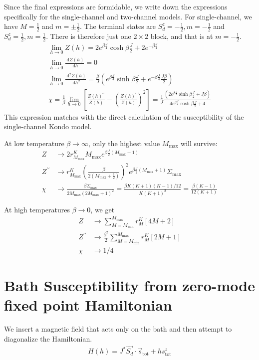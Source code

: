 \documentclass[12pt]{revtex4-2}
\begin{document}
Since the final expressions are formidable, we write down the expressions specifically for the single-channel and two-channel models. For single-channel, we have \(M=\frac{1}{2}\) and \(m = \pm \frac{1}{2}\). The terminal states are \(S_d^z=-\frac{1}{2}, m=-\frac{1}{2}\) and \(S_d^z=\frac{1}{2}, m=\frac{1}{2}\). There is therefore just one \(2\times 2\) block, and that is at \(m=-\frac{1}{2}\).
\begin{gather}
	\lim_{h \to 0}Z(h) = 2e^{\beta \frac{J}{4}}\cosh \beta \frac{J}{2} + 2e^{-\beta \frac{J}{4}} \\
	\lim_{h \to 0}\frac{\:\mathrm{d}Z(h)}{\:\mathrm{d}h} = 0 \\
	\lim_{h \to 0}\frac{\:\mathrm{d}^2Z(h)}{\:\mathrm{d}h^2} = \frac{\beta}{J}\left(e^{\beta \frac{J}{4}}\sinh \beta\frac{J}{2} + e^{-\beta \frac{J}{4}}\frac{J \beta}{2}\right)\\
	\chi = \frac{1}{\beta}\lim_{h \to 0}\left[\frac{Z(h)^{\prime\prime}}{Z(h)} - \left(\frac{Z(h)^{\prime}}{Z(h)}\right)^2 \right] = \frac{1}{J}\frac{\left(2e^{\beta \frac{J}{2}}\sinh \beta\frac{J}{2} + J \beta\right)}{4e^{\beta \frac{J}{2}}\cosh \beta \frac{J}{2} + 4}
\end{gather}
This expression matches with the direct calculation of the susceptibility of the single-channel Kondo model.

At low temperature \(\beta \to \infty\), only the highest value \(M_\text{max}\) will survive:
\begin{align}
	Z &\to 2 r^K_{M_\text{max}} M_\text{max} e^{\beta \frac{J}{2}(M_\text{max} + 1)}\\
	Z^{\prime \prime} &\to r^K_{M_\text{max}}\left(\frac{\beta }{2(M_\text{max} + \frac{1}{2})}\right)^2 e^{\beta \frac{J}{2}(M_\text{max} + 1)}\Sigma_\text{max}\\
	\chi &\to \frac{\beta\Sigma_\text{max}}{2M_\text{max}\left(2M_\text{max}+1\right)^2} = \frac{\beta K(K+1)(K-1)/12}{K(K+1)^2} = \frac{\beta(K-1)}{12(K+1)}
\end{align}

At high temperatures \(\beta \to 0\), we get
\begin{align}
	Z &\to \sum_{M=M_\text{min}}^{M_\text{max}}r^K_M\left[4M + 2\right]\\
	Z^{\prime \prime} &\to \frac{\beta^2}{2}\sum_{M=M_\text{min}}^{M_\text{max}}r^K_M\left[2M + 1\right]\\
	\chi &\to 1/4
\end{align}

\section{Bath Susceptibility from zero-mode fixed point Hamiltonian}
We insert a magnetic field that acts only on the bath and then attempt to diagonalize the Hamiltonian.
\begin{align}
	\label{bath_field_ham}
	H(h) = J^* \vec{S_d}\cdot\vec{s}_\text{tot} + h s^z_\text{tot}
\end{align}
\end{document}
